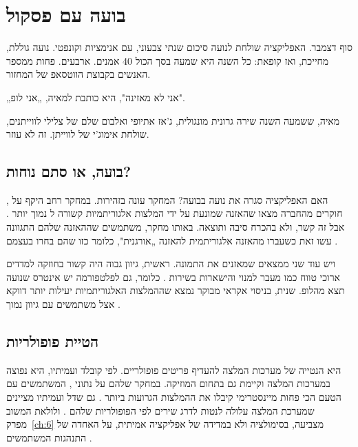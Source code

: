 
\chapter{בועה עם פסקול}\label{ch:7}

\begin{scene}
סוף דצמבר. האפליקציה שולחת לנועה סיכום שנתי צבעוני, עם אנימציות וקונפטי. נועה גוללת, מחייכת, ואז קופאת: כל השנה היא שמעה בסך הכול 40 אמנים. ארבעים. פחות ממספר האנשים בקבוצת הווטסאפ של המחזור.

„אני לא מאזינה", היא כותבת למאיה, „אני לופ".

מאיה, ששמעה השנה שירה גרונית מונגולית, ג'אז אתיופי ואלבום שלם של צלילי לווייתנים, שולחת אימוג'י של לווייתן. זה לא עוזר.
\end{scene}

\section{בועה, או סתם נוחות?}

האם האפליקציה סגרה את נועה בבועה? המחקר עונה בזהירות. במחקר רחב היקף על , חוקרים מהחברה מצאו שהאזנה שמונעת על ידי המלצות אלגוריתמיות קשורה ל נמוך יותר \cite{anderson2020algorithmic}. אבל זה קשר, ולא בהכרח סיבה ותוצאה. באותו מחקר, משתמשים שההאזנה שלהם התגוונה עשו זאת כשעברו מהאזנה אלגוריתמית להאזנה „אורגנית", כלומר כזו שהם בחרו בעצמם \cite{anderson2020algorithmic}.

ויש עוד שני ממצאים שמאזנים את התמונה. ראשית, גיוון גבוה היה קשור בחוזקה למדדים ארוכי טווח כמו מעבר למנוי והישארות בשירות \cite{anderson2020algorithmic}. כלומר, גם לפלטפורמה יש אינטרס שנועה תצא מהלופ. שנית, בניסוי אקראי מבוקר נמצא שההמלצות האלגוריתמיות יעילות יותר דווקא אצל משתמשים עם גיוון נמוך \cite{anderson2020algorithmic}.

\section{הטיית פופולריות}

 היא הנטייה של מערכות המלצה להעדיף פריטים פופולריים. לפי קובלד ועמיתיו, היא נפוצה במערכות המלצה וקיימת גם בתחום המוזיקה. במחקר שלהם על נתוני , המשתמשים עם הטעם הכי פחות מיינסטרימי קיבלו את ההמלצות הגרועות ביותר \cite{kowald2020unfairness}. גם שדל ועמיתיו מציינים שמערכת המלצה עלולה לנטות לדרג שירים לפי הפופולריות שלהם \cite{schedl2018current}. ולולאת המשוב מפרק~\ref{ch:6} מצביעה, בסימולציה ולא במדידה של אפליקציה אמיתית, על האחדה של התנהגות המשתמשים \cite{chaney2018algorithmic}.

